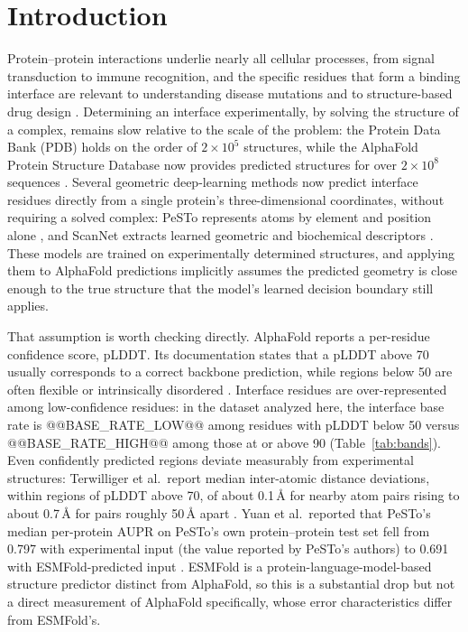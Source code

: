 \documentclass[10pt]{article}
\begin{document}
\section{Introduction}

Protein--protein interactions underlie nearly all cellular processes, from
signal transduction to immune recognition, and the specific residues that form
a binding interface are relevant to understanding disease mutations and to
structure-based drug design \cite{zhang2024}. Determining an interface
experimentally, by solving the structure of a complex, remains slow relative to
the scale of the problem: the Protein Data Bank (PDB) holds on the order of
$2\times10^5$ structures, while the AlphaFold Protein Structure Database now
provides predicted structures for over $2\times10^8$ sequences
\cite{jumper2021,varadi2024}. Several geometric deep-learning methods now
predict interface residues directly from a single protein's three-dimensional
coordinates, without requiring a solved complex: PeSTo represents atoms by
element and position alone \cite{krapp2023}, and ScanNet extracts learned
geometric and biochemical descriptors \cite{tubiana2022}. These models are
trained on experimentally determined structures, and applying them to
AlphaFold predictions implicitly assumes the predicted geometry is close
enough to the true structure that the model's learned decision boundary still
applies.

That assumption is worth checking directly. AlphaFold reports a per-residue
confidence score, pLDDT. Its documentation states that a pLDDT above 70
usually corresponds to a correct backbone prediction, while regions below 50
are often flexible or intrinsically disordered \cite{afdbplddt}. Interface
residues are over-represented among low-confidence residues: in the dataset
analyzed here, the interface base rate is @@BASE_RATE_LOW@@ among residues
with pLDDT below 50 versus @@BASE_RATE_HIGH@@ among those at or above 90
(Table~\ref{tab:bands}). Even confidently predicted regions deviate
measurably from experimental structures: Terwilliger et al.\ report median
inter-atomic distance deviations, within regions of pLDDT above 70, of about
0.1\,\r{A} for nearby atom pairs rising to about 0.7\,\r{A} for pairs
roughly 50\,\r{A} apart \cite{terwilliger2024}. Yuan et al.\ reported that
PeSTo's median per-protein AUPR on PeSTo's own protein--protein test set fell
from 0.797 with experimental input (the value reported by PeSTo's authors)
to 0.691 with ESMFold-predicted input \cite{yuan2024,lin2023}. ESMFold is a
protein-language-model-based structure predictor distinct from AlphaFold,
so this is a substantial drop but not a direct measurement of AlphaFold
specifically, whose error characteristics differ from ESMFold's.
\end{document}
